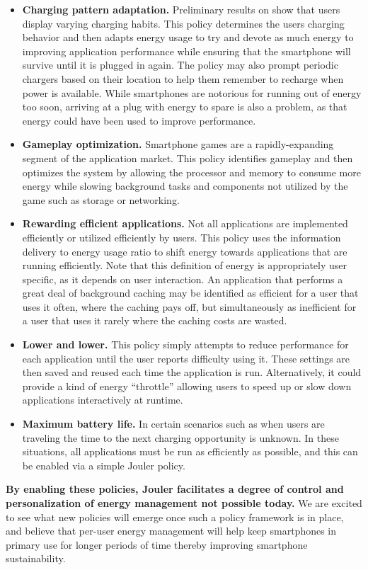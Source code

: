 \begin{itemize}

\item \textbf{Charging pattern adaptation.} Preliminary results on
\PhoneLab{} show that users display varying charging habits. This policy
determines the users charging behavior and then adapts energy usage to try
and devote as much energy to improving application performance while ensuring
that the smartphone will survive until it is plugged in again. The policy may
also prompt periodic chargers based on their location to help them remember
to recharge when power is available. While smartphones are notorious for
running out of energy too soon, arriving at a plug with energy to spare is
also a problem, as that energy could have been used to improve performance.

\item \textbf{Gameplay optimization.} Smartphone games are a
rapidly-expanding segment of the application market. This policy identifies
gameplay and then optimizes the system by allowing the processor and memory
to consume more energy while slowing background tasks and components not
utilized by the game such as storage or networking.

\item \textbf{Rewarding efficient applications.} Not all applications are
implemented efficiently or utilized efficiently by users. This policy uses
the information delivery to energy usage ratio to shift energy towards
applications that are running efficiently. Note that this definition of
energy is appropriately user specific, as it depends on user interaction. An
application that performs a great deal of background caching may be
identified as efficient for a user that uses it often, where the caching pays
off, but simultaneously as inefficient for a user that uses it rarely where
the caching costs are wasted.

\item \textbf{Lower and lower.} This policy simply attempts to reduce
performance for each application until the user reports difficulty using it.
These settings are then saved and reused each time the application is run.
Alternatively, it could provide a kind of energy ``throttle'' allowing users
to speed up or slow down applications interactively at runtime.

\item \textbf{Maximum battery life.} In certain scenarios such as when users
are traveling the time to the next charging opportunity is unknown. In these
situations, all applications must be run as efficiently as possible, and this
can be enabled via a simple Jouler policy.

\end{itemize}

\textbf{By enabling these policies, Jouler facilitates a degree of control
and personalization of energy management not possible today.} We are excited
to see what new policies will emerge once such a policy framework is in
place, and believe that per-user energy management will help keep smartphones
in primary use for longer periods of time thereby improving smartphone
sustainability.
